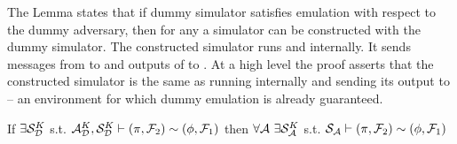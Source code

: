 The Lemma states that if dummy simulator satisfies emulation with respect to the dummy adversary, then for any \Adversary a simulator can be constructed with the dummy simulator. 
The constructed simulator runs \Adversary and \Dummysim internally. It sends messages from \Environment to \Adversary and outputs of \Adversary to \Dummysim.
At a high level the proof asserts that the constructed simulator is the same as \Environment running \Adversary internally and sending its output to \Dummysim -- an environment for which dummy emulation is already guaranteed.


\begin{theorem}\label{thm:dummy}
If $\exists \mathcal{S}_{\mathcal{D}}^{K}$ s.t. $ \mathcal{A}_\mathcal{D}^K, \mathcal{S}_{\mathcal{D}}^K \vdash (\pi, \mathcal{F}_2) \sim (\phi, \mathcal{F}_1)$ then $\forall \mathcal{A} \ \exists \mathcal{S}_\mathcal{A}^K$ s.t. $\mathcal{S}_{\mathcal{A}} \vdash  (\pi, \mathcal{F}_2) \sim (\phi, \mathcal{F}_1)$ 
\end{theorem}

